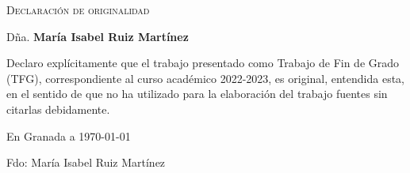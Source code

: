 \newpage
\null
\thispagestyle{empty}
\newpage
\null
\thispagestyle{empty}

\hfill\vfill

\textsc{Declaración de originalidad}\\\bigskip

Dña. \textbf{María Isabel Ruiz Martínez} \\\medskip

Declaro explícitamente que el trabajo presentado como Trabajo de Fin de Grado (TFG), correspondiente al curso académico 2022-2023, es original, entendida esta, en el sentido de que no ha utilizado para la elaboración del trabajo fuentes sin citarlas debidamente.
\medskip

En Granada a \today
\begin{flushleft}
Fdo: María Isabel Ruiz Martínez

\end{flushleft}

\vfill

\endinput